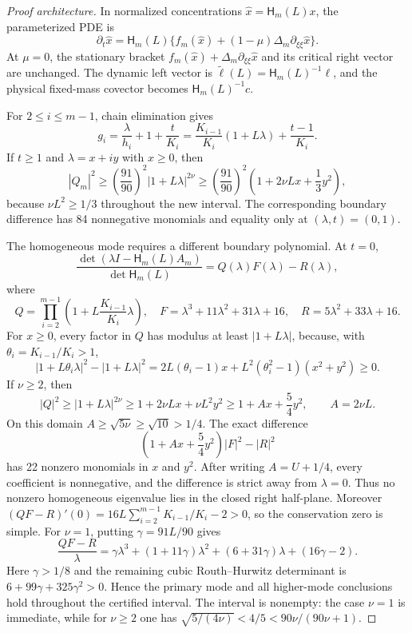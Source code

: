 \documentclass[11pt]{article}
\theoremstyle{definition}
\newcommand{\1}{\mathbf 1}
\begin{document}
\begin{proof}[Proof architecture]
In normalized concentrations $\widehat x=\mathsf H_m(L)x$, the parameterized
PDE is
\begin{equation}\label{eq:normalizedPDE}
 \partial_t\widehat x=\mathsf H_m(L)
 \{f_m(\widehat x)+(1-\mu)\Delta_m\partial_{\xi\xi}\widehat x\}.
\end{equation}
At $\mu=0$, the stationary bracket
$f_m(\widehat x)+\Delta_m\partial_{\xi\xi}\widehat x$ and its critical
right vector are unchanged.  The dynamic left vector is
$\widetilde\ell(L)=\mathsf H_m(L)^{-1}\ell$, and the physical fixed-mass covector becomes
$\mathsf H_m(L)^{-1}c$.

For $2\le i\le m-1$, chain elimination gives
\[
 g_i=\frac{\lambda}{h_i}+1+\frac{t}{K_i}
 =\frac{K_{i-1}}{K_i}(1+L\lambda)+\frac{t-1}{K_i}.
\]
If $t\ge1$ and $\lambda=x+iy$ with $x\ge0$, then
\[
 |Q_m|^2\ge\left(\frac{91}{90}\right)^2|1+L\lambda|^{2\nu}
 \ge\left(\frac{91}{90}\right)^2
 \left(1+2\nu Lx+\frac13y^2\right),
\]
 because $\nu L^2\ge1/3$ throughout the new interval.  The corresponding
boundary difference has 84 nonnegative monomials and equality only at
$(\lambda,t)=(0,1)$.

The homogeneous mode requires a different boundary polynomial.  At $t=0$,
\[
 \frac{\det(\lambda I-\mathsf H_m(L)A_m)}{\det\mathsf H_m(L)}
 =Q(\lambda)F(\lambda)-R(\lambda),
\]
where
\[
 Q=\prod_{i=2}^{m-1}\left(1+L\frac{K_{i-1}}{K_i}\lambda\right),\quad
 F=\lambda^3+11\lambda^2+31\lambda+16,
 \quad R=5\lambda^2+33\lambda+16.
\]
For $x\ge0$, every factor in $Q$ has modulus at least
$|1+L\lambda|$, because, with $\theta_i=K_{i-1}/K_i>1$,
\[
 |1+L\theta_i\lambda|^2-|1+L\lambda|^2
 =2L(\theta_i-1)x+L^2(\theta_i^2-1)(x^2+y^2)\ge0.
\]
If $\nu\ge2$, then
\[
 |Q|^2\ge |1+L\lambda|^{2\nu}
 \ge1+2\nu Lx+\nu L^2y^2
 \ge1+Ax+\frac54y^2,\qquad A=2\nu L.
\]
On this domain $A\ge\sqrt{5\nu}\ge\sqrt{10}>1/4$.
The exact difference
\[
 \left(1+Ax+\frac54y^2\right)|F|^2-|R|^2
\]
has 22 nonzero monomials in $x$ and $y^2$.  After writing
$A=U+1/4$, every coefficient is nonnegative, and the difference is strict
away from $\lambda=0$.  Thus no nonzero homogeneous eigenvalue lies in the
closed right half-plane.  Moreover
$(QF-R)'(0)=16L\sum_{i=2}^{m-1}K_{i-1}/K_i-2>0$, so the conservation zero is
simple.  For $\nu=1$, putting $\gamma=91L/90$ gives
\[
 \frac{QF-R}{\lambda}
 =\gamma\lambda^3+(1+11\gamma)\lambda^2
 +(6+31\gamma)\lambda+(16\gamma-2).
\]
Here $\gamma>1/8$ and the remaining cubic Routh--Hurwitz determinant is
$6+99\gamma+325\gamma^2>0$.  Hence the primary mode and all higher-mode
conclusions hold throughout the certified interval.  The interval is nonempty: the case
$\nu=1$ is immediate, while for $\nu\ge2$ one has
$\sqrt{5/(4\nu)}<4/5<90\nu/(90\nu+1)$.


\end{proof}
\end{document}
